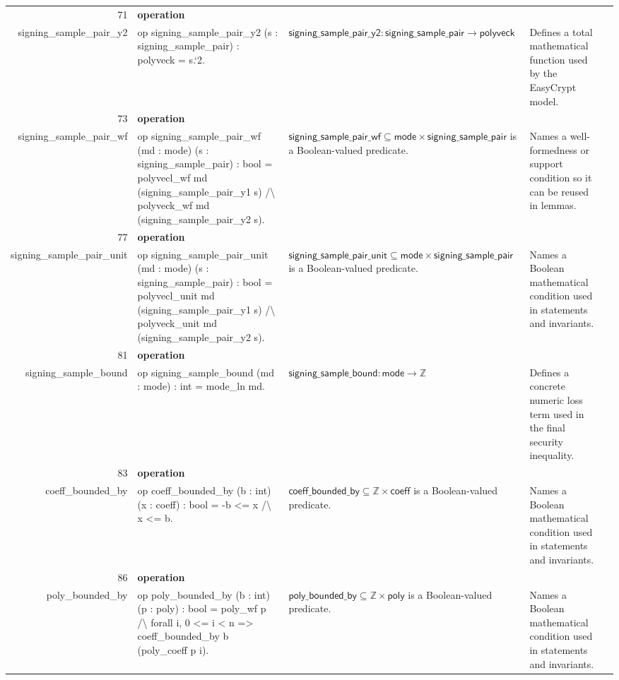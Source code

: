\documentclass[10pt]{article}
\newcommand{\ec}[1]{\begingroup\ttfamily\scriptsize #1\endgroup}
\begin{document}
\begin{longtable}{r L{0.17\textwidth} L{0.26\textwidth} L{0.27\textwidth} L{0.20\textwidth}}
71 & \textbf{operation}\\\ec{signing\_sample\_pair\_y2} & \ec{op signing\_sample\_pair\_y2 (s : signing\_sample\_pair) : polyveck = s.`2.} & \(\mathsf{signing\_sample\_pair\_y2} : \mathsf{signing\_sample\_pair} \to \mathsf{polyveck}\) & Defines a total mathematical function used by the EasyCrypt model. \\
73 & \textbf{operation}\\\ec{signing\_sample\_pair\_wf} & \ec{op signing\_sample\_pair\_wf (md : mode) (s : signing\_sample\_pair) : bool = polyvecl\_wf md (signing\_sample\_pair\_y1 s) /\textbackslash{} polyveck\_wf md (signing\_sample\_pair\_y2 s).} & \(\mathsf{signing\_sample\_pair\_wf} \subseteq \mathsf{mode} \times \mathsf{signing\_sample\_pair}\) is a Boolean-valued predicate. & Names a well-formedness or support condition so it can be reused in lemmas. \\
77 & \textbf{operation}\\\ec{signing\_sample\_pair\_unit} & \ec{op signing\_sample\_pair\_unit (md : mode) (s : signing\_sample\_pair) : bool = polyvecl\_unit md (signing\_sample\_pair\_y1 s) /\textbackslash{} polyveck\_unit md (signing\_sample\_pair\_y2 s).} & \(\mathsf{signing\_sample\_pair\_unit} \subseteq \mathsf{mode} \times \mathsf{signing\_sample\_pair}\) is a Boolean-valued predicate. & Names a Boolean mathematical condition used in statements and invariants. \\
81 & \textbf{operation}\\\ec{signing\_sample\_bound} & \ec{op signing\_sample\_bound (md : mode) : int = mode\_ln md.} & \(\mathsf{signing\_sample\_bound} : \mathsf{mode} \to \mathbb{Z}\) & Defines a concrete numeric loss term used in the final security inequality. \\
83 & \textbf{operation}\\\ec{coeff\_bounded\_by} & \ec{op coeff\_bounded\_by (b : int) (x : coeff) : bool = -b <= x /\textbackslash{} x <= b.} & \(\mathsf{coeff\_bounded\_by} \subseteq \mathbb{Z} \times \mathsf{coeff}\) is a Boolean-valued predicate. & Names a Boolean mathematical condition used in statements and invariants. \\
86 & \textbf{operation}\\\ec{poly\_bounded\_by} & \ec{op poly\_bounded\_by (b : int) (p : poly) : bool = poly\_wf p /\textbackslash{} forall i, 0 <= i < n => coeff\_bounded\_by b (poly\_coeff p i).} & \(\mathsf{poly\_bounded\_by} \subseteq \mathbb{Z} \times \mathsf{poly}\) is a Boolean-valued predicate. & Names a Boolean mathematical condition used in statements and invariants. \\

\end{longtable}
\end{document}
